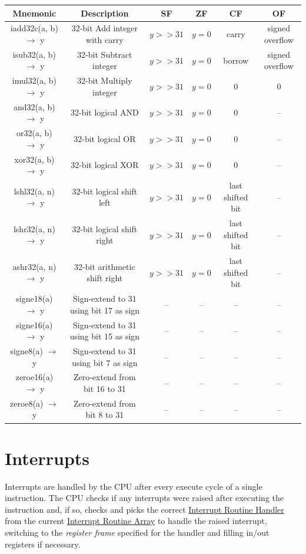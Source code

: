 \documentclass[a4paper,10pt]{article}
\begin{document}
\begin{table}[H]
	\centering
	\resizebox{\linewidth}{!}
	{
		\begin{tabular}{|c|c|c|c|c|c|}
\hline
Mnemonic & Description & SF & ZF & CF & OF \\
\hline
iadd32c(a, b) $\to$ y & 32-bit Add integer with carry & $y>>31$ & $y=0$ & carry & signed overflow \\
\hline
isub32(a, b) $\to$ y & 32-bit Subtract integer & $y>>31$ & $y=0$ & borrow & signed overflow \\
\hline
imul32(a, b) $\to$ y & 32-bit Multiply integer & $y>>31$ & $y=0$ & 0 & 0 \\
\hline
and32(a, b) $\to$ y & 32-bit logical AND & $y>>31$ & $y=0$ & 0 & -- \\
\hline
or32(a, b) $\to$ y & 32-bit logical OR & $y>>31$ & $y=0$ & 0 & -- \\
\hline
xor32(a, b) $\to$ y & 32-bit logical XOR & $y>>31$ & $y=0$ & 0 & -- \\
\hline
lshl32(a, n) $\to$ y & 32-bit logical shift left & $y>>31$ & $y=0$ & last shifted bit & -- \\
\hline
lshr32(a, n) $\to$ y & 32-bit logical shift right & $y>>31$ & $y=0$ & last shifted bit & -- \\
\hline
ashr32(a, n) $\to$ y & 32-bit arithmetic shift right & $y>>31$ & $y=0$ & last shifted bit & -- \\
\hline
signe18(a) $\to$ y & Sign-extend to 31 using bit 17 as sign & -- & -- & -- & -- \\
\hline
signe16(a) $\to$ y & Sign-extend to 31 using bit 15 as sign & -- & -- & -- & -- \\
\hline
signe8(a) $\to$ y & Sign-extend to 31 using bit 7 as sign & -- & -- & -- & -- \\
\hline
zeroe16(a) $\to$ y & Zero-extend from bit 16 to 31 & -- & -- & -- & -- \\
\hline
zeroe8(a) $\to$ y & Zero-extend from bit 8 to 31 & -- & -- & -- & -- \\
\hline
		\end{tabular}
	}
\end{table}

\section{Interrupts}
Interrupts are handled by the CPU after every execute cycle of a single instruction. The CPU checks if any interrupts were raised after executing the instruction and, if so, checks and picks the correct \hyperref[ir:HANDLER]{Interrupt Routine Handler} from the current \hyperref[ir:ARRAY]{Interrupt Routine Array} to handle the raised interrupt, switching to the \emph{register frame} specified for the handler and filling in/out registers if necessary.
\end{document}
